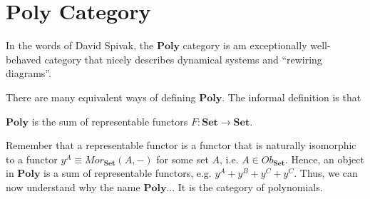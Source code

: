 \newpage
\section{$\mathbf{Poly}$ Category}

In the words of David Spivak, the $\mathbf{Poly}$ category is am exceptionally well-behaved
category that nicely describes dynamical systems and ``rewiring diagrams''.

There are many equivalent ways of defining $\mathbf{Poly}$. The informal
definition is that
\begin{definition}
	$\mathbf{Poly}$ is the sum of representable functors $F:\mathbf{Set} \to \mathbf{Set}$.
\end{definition}

Remember that a representable functor is a functor that is naturally isomorphic
to a functor $y^A \equiv Mor_\mathbf{Set} (A,-)$ for some set $A$, i.e. $A \in Ob_\mathbf{Set}$.
Hence, an object in $\mathbf{Poly}$ is a sum of representable functors, e.g.
$y^A + y^B + y^C + y^C$.
Thus, we can now understand why the name $\mathbf{Poly}$... It is the category
of polynomials.
